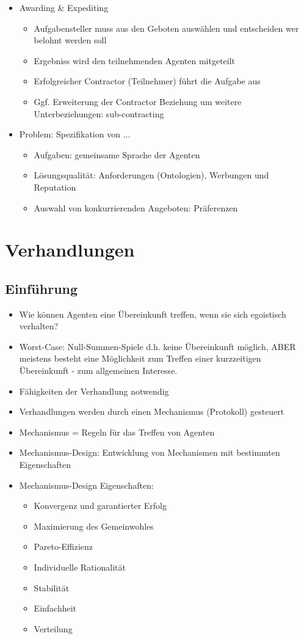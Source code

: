 \documentclass{article} %
\begin{document}
\begin{itemize}
\begin{itemize}
		\end{itemize}
		\item Awarding \& Expediting
		\begin{itemize}
			\item Aufgabensteller muss aus den Geboten auswählen und entscheiden wer belohnt werden soll
			\item Ergebniss wird den teilnehmenden Agenten mitgeteilt
			\item Erfolgreicher Contractor (Teilnehmer) führt die Aufgabe aus
			\item Ggf. Erweiterung der Contractor Beziehung um weitere Unterbeziehungen: sub-contracting
		\end{itemize}
		\item Problem: Spezifikation von ...
		\begin{itemize}
			\item Aufgaben: gemeinsame Sprache der Agenten
			\item Lösungsqualität: Anforderungen (Ontologien), Werbungen und Reputation
			\item Auswahl von konkurrierenden Angeboten: Präferenzen
		\end{itemize}
	\end{itemize}
	\section{Verhandlungen}
	\subsection{Einführung}
	\begin{itemize}
		\item Wie können Agenten eine Übereinkunft treffen, wenn sie sich egoistisch verhalten?
		\item Worst-Case: Null-Summen-Spiele d.h. keine Übereinkunft möglich, ABER meistens besteht eine Möglichkeit zum Treffen einer kurzzeitigen Übereinkunft - zum allgemeinen Interesse.
		\item Fähigkeiten der Verhandlung notwendig
		\item Verhandlungen werden durch einen Mechanismus (Protokoll) gesteuert
		\item Mechanismus = Regeln für das Treffen von Agenten
		\item Mechanismus-Design: Entwicklung von Mechanismen mit bestimmten Eigenschaften
		\item Mechanismus-Design Eigenschaften:
		\begin{itemize}
			\item Konvergenz und garantierter Erfolg
			\item Maximierung des Gemeinwohles
			\item Pareto-Effizienz
			\item Individuelle Rationalität
			\item Stabilität
			\item Einfachheit
			\item Verteilung
		\end{itemize} 
	\end{itemize}
\end{document}
